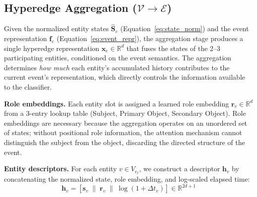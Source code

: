 \documentclass[letterpaper,twocolumn,10pt]{article}
\begin{document}
\subsection{Hyperedge Aggregation ($\mathcal{V} \to \mathcal{E}$)}
\label{sec:aggregation}

Given the normalized entity states $\hat{\mathbf{S}}_e$ (Equation~\ref{eq:state_norm}) and the event representation $\mathbf{f}_e$ (Equation~\ref{eq:event_repr}), the aggregation stage produces a single hyperedge representation $\mathbf{x}_e \in \mathbb{R}^d$ that fuses the states of the 2--3 participating entities, conditioned on the event semantics. The aggregation determines \emph{how much} each entity's accumulated history contributes to the current event's representation, which directly controls the information available to the classifier.

\textbf{Role embeddings.} Each entity slot is assigned a learned role embedding $\mathbf{r}_v \in \mathbb{R}^d$ from a 3-entry lookup table (Subject, Primary Object, Secondary Object). Role embeddings are necessary because the aggregation operates on an unordered set of states; without positional role information, the attention mechanism cannot distinguish the subject from the object, discarding the directed structure of the event.

\textbf{Entity descriptors.} For each entity $v \in V_{e_t}$, we construct a descriptor $\mathbf{h}_v$ by concatenating the normalized state, role embedding, and log-scaled elapsed time:
\begin{equation}
    \mathbf{h}_v = [\hat{\mathbf{s}}_v \;\|\; \mathbf{r}_v \;\|\; \log(1 + \Delta t_v)] \in \mathbb{R}^{2d + 1}
    \label{eq:entity_descriptor}
\end{equation}
\end{document}
